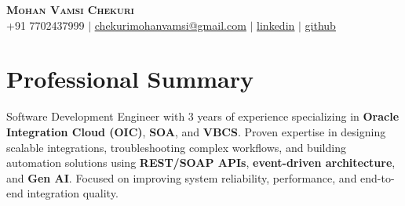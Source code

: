 \documentclass[letterpaper,11pt]{article}
\begin{document}
\begin{center}
    \textbf{\Huge \scshape Mohan Vamsi Chekuri} \\ \vspace{1pt}
    \small +91 7702437999 $|$ \href{mailto:chekurimohanvamsi@gmail.com}{\underline{chekurimohanvamsi@gmail.com}} $|$
    \href{https://www.linkedin.com/in/mvamsi73}{\underline{linkedin}} $|$
    \href{https://github.com}{\underline{github}}
\end{center}

\section{Professional Summary}
Software Development Engineer with 3 years of experience specializing in \textbf{Oracle Integration Cloud (OIC)}, \textbf{SOA}, and \textbf{VBCS}. Proven expertise in designing scalable integrations, troubleshooting complex workflows, and building automation solutions using \textbf{REST/SOAP APIs}, \textbf{event-driven architecture}, and \textbf{Gen AI}. Focused on improving system reliability, performance, and end-to-end integration quality.
\end{document}
